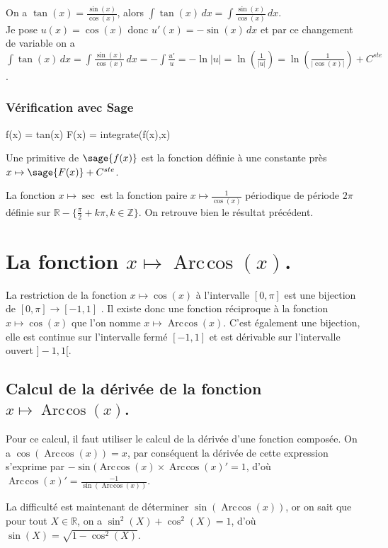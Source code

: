 \documentclass[a4paper,12pt]{report}
\def\eclaire{\mathbb}
\def\R{\ensuremath{\eclaire R}}
\def\Z{\ensuremath{\eclaire Z}}
\renewcommand{\arccos}{\mathop{\mathrm{Arc\mspace{2mu}cos}}}
\begin{document}
On a $\tan(x)=\frac{\sin(x)}{\cos(x)}$, alors $\int \tan(x) \, dx =\int \frac{\sin(x)}{\cos(x)}\, dx$.\\
Je pose $u(x)=\cos(x)$ donc $u'(x)= -\sin(x) \,dx$ et par ce changement de variable on a $\int \tan(x) \, dx = \int \frac{\sin(x)}{\cos(x)}\, dx  = -\int \frac{u'}{u} = -\ln|u|  = \ln\left(\frac{1}{|u|}\right)  = \ln\left(\frac{1}{|\cos(x)|}\right) +C^{ste}$.


\subsubsection*{Vérification avec Sage}

\begin{sageblock}
    f(x) = tan(x)
    F(x) = integrate(f(x),x)
\end{sageblock}

Une primitive de $\sage{f(x)}$ est la fonction définie à une constante près $x \mapsto \sage{F(x)} + C^{ste} $.

La fonction $x\mapsto \sec$ est la fonction paire $x\mapsto \frac{1}{\cos(x)}$ périodique de période $2\pi$ définie sur $\R-\{ \frac{\pi}{2}+k\pi, k\in\Z\}$. On retrouve bien le résultat précédent.


\section{La fonction  $x \mapsto \arccos(x) $.}


La restriction de la fonction $x \mapsto \cos(x) $ à l'intervalle $[0,\pi]$ est une bijection de $[0,\pi] \rightarrow [-1,1]$ . Il existe donc une fonction réciproque à la fonction $x \mapsto \cos(x) $ que l'on nomme $x \mapsto \arccos(x) $. C'est également une bijection, elle est continue sur l'intervalle fermé  $ [-1,1]$ et est dérivable sur l'intervalle ouvert $]-1,1[$.

\subsection{Calcul de la dérivée de la fonction $x \mapsto \arccos(x) $.}

Pour ce calcul, il faut utiliser le calcul de la dérivée d'une fonction composée. On a $\cos(\arccos(x))=x$, par conséquent la dérivée de cette expression s'exprime par $ -\sin(\arccos(x) \times \arccos(x)' = 1$, d'où $\arccos(x)' = \frac{-1}{\sin(\arccos(x))} $.

La difficulté est maintenant de déterminer $\sin(\arccos(x))$, or on sait que pour tout $X \in \R$, on a $\sin^2(X) + \cos^2(X) = 1$, d'où $\sin(X) = \sqrt{1-\cos^2(X)}$.
\end{document}
